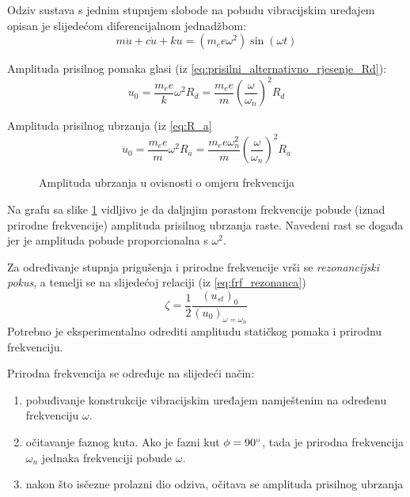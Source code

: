 Odziv sustava s jednim stupnjem slobode na pobudu vibracijskim uređajem opisan je
slijedećom diferencijalnom jednadžbom:
\begin{equation}
    m\ddot{u}+c\dot{u}+ku=(m_ee\omega^2)\sin(\omega t)
\end{equation}

Amplituda prisilnog pomaka glasi (iz \eqref{eq:prisilni_alternativno_rjesenje_Rd}):
\begin{equation}
    u_0=\frac{m_ee}{k}\omega^2R_d = \frac{m_ee}{m}\left(\frac{\omega}{\omega_n}\right)^2R_d
\end{equation}

Amplituda prisilnog ubrzanja (iz \eqref{eq:R_a}
\begin{equation}
    \ddot{u}_0=\frac{m_ee}{m}\omega^2R_a=\frac{m_ee\omega_n^2}{m}\left(\frac{\omega}{\omega_n}\right)^2R_a
\end{equation}

\begin{figure}[H]
    
    \caption{Amplituda ubrzanja u ovisnosti o omjeru frekvencija}
    \label{fig:ra-vibracijski}
\end{figure}

Na grafu sa slike \ref{fig:ra-vibracijski} vidljivo je da daljnjim porastom frekvencije pobude (iznad prirodne
frekvencije) amplituda prisilnog ubrzanja raste. Navedeni rast se događa jer je
amplituda pobude proporcionalna s $\omega^2$. 
\par

Za određivanje stupnja prigušenja i prirodne frekvencije vrši se
\textit{rezonancijski pokus}, a temelji se na slijedećoj relaciji (iz \eqref{eq:frf_rezonanca})
\begin{equation}\label{eq:rezonancijski_pokus}
    \zeta = \frac{1}{2}\frac{(u_{st})_0}{(u_0)_{\omega=\omega_n}}
\end{equation}
Potrebno je eksperimentalno odrediti amplitudu statičkog pomaka i prirodnu frekvenciju. 

Prirodna frekvencija se određuje na slijedeći način:
\begin{enumerate}
    \item pobuđivanje konstrukcije vibracijskim uređajem namještenim na
        određenu frekvenciju $\omega$.
    \item očitavanje faznog kuta. Ako je fazni kut $\phi = 90\degree$, tada je
        prirodna frekvencija $\omega_n$ jednaka frekvenciji pobude $\omega$.
    \item nakon što isčezne prolazni dio odziva, očitava se amplituda prisilnog ubrzanja
\end{enumerate}

